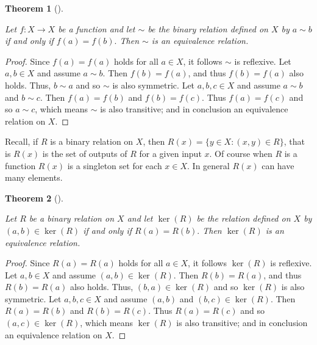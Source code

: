\documentclass[
  letterpaper,
  10pt,
  reqno,
  twopage,
  openany]{book}
\theoremstyle{plain}
\theoremstyle{definition}
\theoremstyle{definition}
\theoremstyle{definition}
\theoremstyle{plain}
\theoremstyle{plain}
\newtheorem{theorem}{Theorem}[chapter]
\theoremstyle{remark}
\begin{document}
\leavevmode{}%
\begin{theorem}[]\label{thm-function-equivalence-relation}

Let \(f:X\to X\) be a function and let \(\sim\) be the binary relation
defined on \(X\) by \(a\sim b\) if and only if \(f(a)=f(b).\) Then
\(\sim\) is an equivalence relation.

\end{theorem}

\begin{proof}

Since \(f(a)=f(a)\) holds for all \(a\in X\), it follows \(\sim\) is
reflexive. Let \(a,b\in X\) and assume \(a\sim b.\) Then \(f(b)=f(a)\),
and thus \(f(b)=f(a)\) also holds. Thus, \(b\sim a\) and so \(\sim\) is
also symmetric. Let \(a,b,c\in X\) and assume \(a\sim b\) and
\(b\sim c.\) Then \(f(a)=f(b)\) and \(f(b)=f(c).\) Thus \(f(a)=f(c)\)
and so \(a\sim c\), which means \(\sim\) is also transitive; and in
conclusion an equivalence relation on \(X.\)

\end{proof}

Recall, if \(R\) is a binary relation on \(X\), then
\(R(x)=\{y\in X : (x,y)\in R\}\), that is \(R(x)\) is the set of outputs
of \(R\) for a given input \(x.\) Of course when \(R\) is a function
\(R(x)\) is a singleton set for each \(x\in X.\) In general \(R(x)\) can
have many elements.

\leavevmode{}%
\begin{theorem}[]\label{thm-kernel-equivalence}

Let \(R\) be a binary relation on \(X\) and let \(\ker(R)\) be the
relation defined on \(X\) by \((a,b)\in \ker(R)\) if and only if
\(R(a)=R(b).\) Then \(\ker(R)\) is an equivalence relation.

\end{theorem}

\begin{proof}

Since \(R(a)=R(a)\) holds for all \(a\in X\), it follows \(\ker(R)\) is
reflexive. Let \(a,b\in X\) and assume \((a,b)\in \ker(R).\) Then
\(R(b)=R(a)\), and thus \(R(b)=R(a)\) also holds. Thus,
\((b,a)\in\ker(R)\) and so \(\ker(R)\) is also symmetric. Let
\(a,b,c\in X\) and assume \((a,b)\) and \((b,c)\in\ker(R).\) Then
\(R(a)=R(b)\) and \(R(b)=R(c).\) Thus \(R(a)=R(c)\) and so
\((a,c)\in\ker(R)\), which means \(\ker(R)\) is also transitive; and in
conclusion an equivalence relation on \(X.\)

\end{proof}
\end{document}
